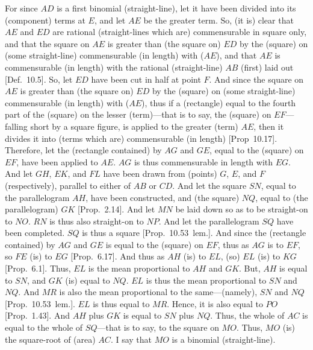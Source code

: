 \begin{Parallel}{}{}
{For since $AD$ is a first binomial (straight-line), let it have been divided
into its (component) terms at $E$, and let $AE$ be the greater term.
So, (it is) clear that $AE$ and $ED$ are rational (straight-lines which are)
commensurable in square only, and that the square on $AE$ is greater
than (the square on) $ED$ by the (square) on (some straight-line)
commensurable (in length) with ($AE$), and that $AE$ is commensurable 
(in length) with
the rational (straight-line) $AB$ (first) laid out [Def.~10.5]. So, let $ED$ have been cut in half
at  point $F$. And since the square on $AE$ is greater than (the square on)
$ED$ by the (square) on (some straight-line) commensurable (in length) with ($AE$),
thus if a (rectangle) equal to the fourth part of the (square) on the lesser (term)---that is to say, the (square) on $EF$---falling short by a square figure,
is applied to the greater (term) $AE$, then it divides it into (terms which are)
commensurable (in length) [Prop~10.17]. 
Therefore, let the (rectangle contained) by $AG$ and $GE$, equal to
the (square) on $EF$, have been applied to $AE$. $AG$ 
is thus commensurable in length with $EG$. And let $GH$, $EK$, and $FL$
have been drawn from (points) $G$, $E$, and $F$ (respectively), parallel to
either of $AB$ or $CD$. And let the square $SN$, equal to the
parallelogram $AH$, have been constructed, and (the square) $NQ$,
equal to (the parallelogram) $GK$ [Prop.~2.14].
And let $MN$ be laid down so as to be straight-on to $NO$. $RN$
is thus also straight-on to $NP$. And let the parallelogram $SQ$ have
been completed. $SQ$ is thus a square [Prop.~10.53~lem.].  And since the (rectangle
contained) by $AG$ and $GE$ is equal to the (square) on $EF$, thus as
$AG$ is to $EF$, so $FE$ (is) to $EG$ [Prop.~6.17]. And thus as $AH$ (is) to
$EL$, (so) $EL$ (is) to $KG$ [Prop.~6.1]. Thus,
$EL$ is the mean proportional to $AH$ and $GK$. But, $AH$ is equal to
$SN$, and $GK$ (is) equal to $NQ$. $EL$ is thus the mean proportional
to $SN$ and $NQ$. And $MR$ is also the mean proportional to the
same---(namely), $SN$ and $NQ$ [Prop.~10.53~lem.]. $EL$ is thus equal to $MR$.
Hence, it is also equal to $PO$ [Prop.~1.43]. And
$AH$ plus $GK$ is equal to $SN$ plus $NQ$. Thus, the whole of $AC$
is equal to the whole of $SQ$---that is to say, to the square on $MO$.
Thus, $MO$ (is) the square-root of (area) $AC$.  I say that $MO$ is a
binomial (straight-line).

}
\end{Parallel}

